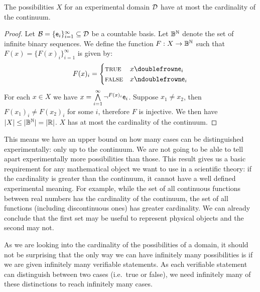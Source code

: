 	\begin{mathSection}
		\begin{thrm}
			The possibilities $X$ for an experimental domain $\edomain$ have at most the cardinality of the continuum.
		\end{thrm}
		
		\begin{proof}
			Let $\basis = \{\stmt[e]_i\}_{i=1}^{\infty} \subseteq \edomain$ be a countable basis. Let $\Bool^{\mathbb{N}}$ denote the set of infinite binary sequences. We define the function $F:X\to\Bool^{\mathbb{N}}$ such that $F(x) = \{F(x)_i\}_{i=1}^{\infty}$ is given by: 
			$$
			F(x)_i = 
			\begin{cases}
				\TRUE & x \comp \stmt[e]_i \\
				\FALSE & x \ncomp \stmt[e]_i
			\end{cases}
			$$
			For each $x \in X$ we have $x = \bigAND\limits_{i=1}^{\infty} \NOT^{F(x)_i} \stmt[e]_i$. Suppose $x_1 \neq x_2$, then $F(x_1)_i \neq F(x_2)_i$ for some $i$, therefore $F$ is injective. We then have $|X| \leq |\Bool^{\mathbb{N}}|=|\mathbb{R}|$. $X$ has at most the cardinality of the continuum.
		\end{proof}
	\end{mathSection}
	
	This means we have an upper bound on how many cases can be distinguished experimentally: only up to the continuum. We are not going to be able to tell apart experimentally more possibilities than those. This result gives us a basic requirement for any mathematical object we want to use in a scientific theory: if the cardinality is greater than the continuum, it cannot have a well defined experimental meaning. For example, while the set of all continuous functions between real numbers has the cardinality of the continuum, the set of all functions (including discontinuous ones) has greater cardinality. We can already conclude that the first set may be useful to represent physical objects and the second may not.
	
	As we are looking into the cardinality of the possibilities of a domain, it should not be surprising that the only way we can have infinitely many possibilities is if we are given infinitely many verifiable statements. As each verifiable statement can distinguish between two cases (i.e.~true or false), we need infinitely many of these distinctions to reach infinitely many cases.
	
